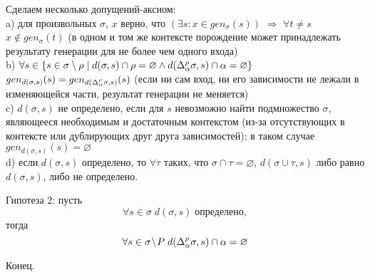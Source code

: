 





Сделаем несколько допущений-аксиом:\\
\indent a) для произвольных $\sigma$, $x$ верно, что $(\exists s: x \in gen_\sigma(s))$ $\Rightarrow$ $\forall t \neq s$ $x \notin gen_\sigma(t)$ (в одном и том же контексте порождение может принадлежать результату генерации для не более чем одного входа)\\
\indent b) $\forall s \in \{s \in \sigma \setminus \rho \mid d(\sigma, s) \cap \rho = \varnothing \wedge d(\Delta_\alpha^\rho\sigma, s) \cap \alpha = \varnothing \}$ $gen_{d(\sigma, s)} (s) = gen_{d(\Delta_\alpha^\rho\sigma, s)} (s)$ (если ни сам вход, ни его зависимости не лежали в изменяющейся части, результат генерации не меняется)\\
\indent c) $d(\sigma, s)$ не определено, если для $s$ невозможно найти подмножество $\sigma$, являющееся необходимым и достаточным контекстом (из-за отсутствующих в контексте или дублирующих друг друга зависимостей); в таком случае $gen_{d(\sigma, s)}(s) = \varnothing$\\
\indent d) если $d(\sigma, s)$ определено, то $\forall \tau$ таких, что $\sigma \cap \tau = \varnothing$, $d(\sigma \cup \tau, s)$ либо равно $d(\sigma, s)$, либо не определено.

Гипотеза 2: пусть
$$\forall s \in \sigma \; d(\sigma, s) \; \text{определено},$$ 
тогда
$$\forall s \in \sigma \! \setminus \! P \; d(\Delta_\alpha^\rho\sigma, s) \cap \alpha = \varnothing$$

\hrulefill

Конец.

